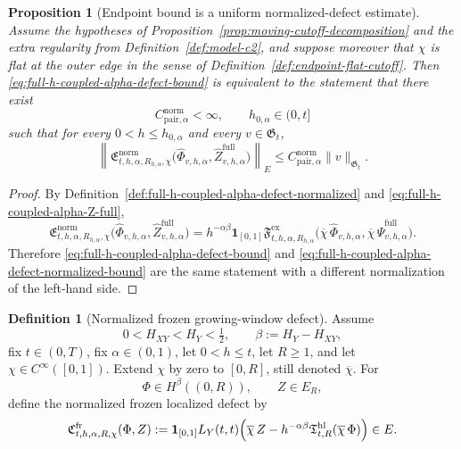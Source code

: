 \documentclass[11pt,a4paper]{amsart}
\theoremstyle{plain}
\newtheorem{proposition}[theorem]{Proposition}
\theoremstyle{definition}
\newtheorem{definition}[theorem]{Definition}
\theoremstyle{remark}
\newcommand{\one}{\mathbf 1}
\begin{document}
\begin{proposition}[Endpoint bound is a uniform normalized-defect estimate]
\label{prop:full-h-coupled-alpha-defect-normalized}
Assume the hypotheses of Proposition~\ref{prop:moving-cutoff-decomposition} and the extra
regularity from Definition~\ref{def:model-c2}, and suppose moreover
that \(\chi\) is flat at the outer edge in the sense of Definition~\ref{def:endpoint-flat-cutoff}.
Then \eqref{eq:full-h-coupled-alpha-defect-bound} is equivalent to the statement that there exist
\[
C_{\mathrm{pair},\alpha}^{\mathrm{norm}}<\infty,
\qquad
h_{0,\alpha}\in(0,t]
\]
such that for every \(0<h\le h_{0,\alpha}\) and every \(v\in\mathfrak G_t\),
\begin{equation}\label{eq:full-h-coupled-alpha-defect-normalized-bound}
\left\|
\mathfrak E_{t,h,\alpha,R_{h,\alpha},\chi}^{\mathrm{norm}}
\bigl(
\widehat\Phi_{v,h,\alpha},
\widehat Z_{v,h,\alpha}^{\mathrm{full}}
\bigr)
\right\|_{E}
\le
C_{\mathrm{pair},\alpha}^{\mathrm{norm}}
\|v\|_{\mathfrak G_t}.
\end{equation}
\end{proposition}

\begin{proof}
By Definition~\ref{def:full-h-coupled-alpha-defect-normalized} and
\eqref{eq:full-h-coupled-alpha-Z-full},
\[
\mathfrak E_{t,h,\alpha,R_{h,\alpha},\chi}^{\mathrm{norm}}
\bigl(
\widehat\Phi_{v,h,\alpha},
\widehat Z_{v,h,\alpha}^{\mathrm{full}}
\bigr)
=
h^{-\alpha\beta}
\one_{[0,1]}
\mathfrak F_{t,h,\alpha,R_{h,\alpha}}^{\mathrm{ex}}
\bigl(
\overline\chi\,\widehat\Phi_{v,h,\alpha},
\overline\chi\,\widehat\Psi_{v,h,\alpha}^{\mathrm{full}}
\bigr).
\]
Therefore \eqref{eq:full-h-coupled-alpha-defect-bound} and
\eqref{eq:full-h-coupled-alpha-defect-normalized-bound} are the same statement with a different
normalization of the left-hand side.
\end{proof}

\begin{definition}[Normalized frozen growing-window defect]
\label{def:full-h-coupled-alpha-frozen}
Assume
\[
0<H_{XY}<H_Y<\tfrac12,
\qquad
\beta:=H_Y-H_{XY},
\]
fix \(t\in(0,T)\), fix \(\alpha\in(0,1)\), let \(0<h\le t\), let \(R\ge1\), and let
\(\chi\in C^\infty([0,1])\). Extend \(\chi\) by zero to \([0,R]\), still denoted \(\overline\chi\).
For
\[
\Phi\in H^\beta((0,R)),
\qquad
Z\in E_R,
\]
define the normalized frozen localized defect by
\begin{equation}\label{eq:full-h-coupled-alpha-frozen}
\mathfrak C_{t,h,\alpha,R,\chi}^{\mathrm{fr}}(\Phi,Z)
:=
\one_{[0,1]}L_Y(t,t)
\Bigl(
\overline\chi\,Z
-
h^{-\alpha\beta}\mathfrak T_{t,R}^{\mathrm{hl}}(\overline\chi\,\Phi)
\Bigr)
\in E.
\end{equation}
\end{definition}
\end{document}
